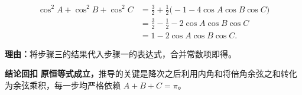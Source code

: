 \begin{proofbox}
\begin{description}[style=nextline, leftmargin=2.8em, labelsep=0.5em, itemsep=0.55em]
    \item[\textbf{步骤四（回代得结论）：}] 
    \[
    \begin{aligned}
    \cos^2 A+\cos^2 B+\cos^2 C 
    &= \frac{3}{2} + \frac{1}{2}\bigl(-1 - 4\cos A\cos B\cos C\bigr)\\
    &= \frac{3}{2} - \frac{1}{2} - 2\cos A\cos B\cos C\\
    &= 1 - 2\cos A\cos B\cos C.
    \end{aligned}
    \]
    \par\textbf{理由：}将步骤三的结果代入步骤一的表达式，合并常数项即得。
\end{description}

\medskip
\textbf{\textcolor{CProof}{结论回扣}}
\textbf{原恒等式成立，}推导的关键是降次之后利用内角和将倍角余弦之和转化为余弦乘积，每一步均严格依赖 $A+B+C=\pi$。
\end{proofbox}
